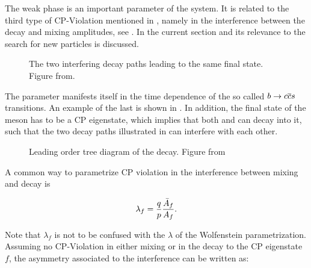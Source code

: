 The weak phase \phis is an important parameter of the \BBbarSyst system. It is related to the third
type of CP-Violation mentioned in , namely in the interference between
the decay and mixing amplitudes, see . In the current section \phis and
its relevance to the search for new particles is discussed.

\newcommand{\ffig}{f}
\newcommand{\phimixfig}{\phi_\text{mix}}
\newcommand{\phifig}{\phi_\text{dec}}
\newcommand{\phibarfig}{\kern 0.15em \overline{\kern -0.15em \phi_\text{dec} \kern -0.60em} \kern 0.60em}
\begin{figure}[h]
  \centering
  \resizebox{0.4\textwidth}{!}{}
  \caption{The two interfering decay paths leading to the same final state. Figure from\cite{jeroenThesis}.}
  \label{interference}
\end{figure}

The parameter \phis manifests itself in the time dependence of the so called $b \rightarrow c\overline {c}s $ transitions.
An example of the last is shown in . In addition, the final state of the \Bs meson has to be
a CP eigenstate, which implies that both \Bs and \Bsb can decay into it, such that the two decay paths
illustrated in  can interfere with each other.

\begin{figure}[!h]
  \centering
  {\sffamily }
  \caption{Leading order tree diagram of the \BsJpsiPhi decay. Figure from\cite{jeroenThesis}}
  \label{bs2jpsiphi}
\end{figure}

A common way to parametrize CP violation in the interference between mixing and decay is

\begin{equation}
  \centering
  \lambda_{f} = \frac{q}{p} \frac{\bar{A}_f}{A_f}. %
\label{lambda_cpv}
\end{equation}

\noindent Note that $\lambda_f$ is not to be confused with the $\lambda$ of the Wolfenstein parametrization.
Assuming no CP-Violation in either \BBbarSyst mixing or in the decay to the CP eigenstate $f$, the asymmetry
associated to the interference can be written as:


